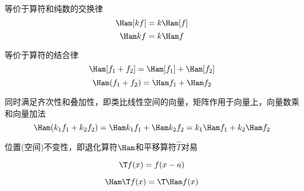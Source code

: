 
\begin{definition}[齐次性]
等价于算符和纯数的交换律
\begin{equation}
	\Ham[kf] = k \Ham[f]
\end{equation}
\begin{equation}
	\Ham k f = k \Ham f
\end{equation}
\end{definition}

\begin{definition}[叠加性]
等价于算符的结合律
\begin{equation}
	\Ham[f_1+f_2] = \Ham[f_1] + \Ham[f_2]
\end{equation}
\begin{equation}
	\Ham(f_1+f_2) = \Ham f_1 + \Ham f_2
\end{equation}
\end{definition}


\begin{definition}[线性]
同时满足齐次性和叠加性，即类比线性空间的向量，矩阵作用于向量上，向量数乘和向量加法
\begin{equation}
	\Ham( k_1 f_1 + k_2 f_2 )
	=
	\Ham k_1 f_1 
	+
	\Ham k_2 f_2 
	=
	 k_1\Ham f_1 
	+
	 k_2\Ham f_2 
\end{equation}
\end{definition}


位置(空间)不变性，即退化算符$\Ham$和平移算符$\hat{T}$对易
\begin{definition}[平移算符]
	\begin{equation}
		\T f(x) =  f(x-a)
	\end{equation}
\end{definition}
\begin{equation}
	\Ham \T f(x) = \T \Ham f(x) 
\end{equation}
